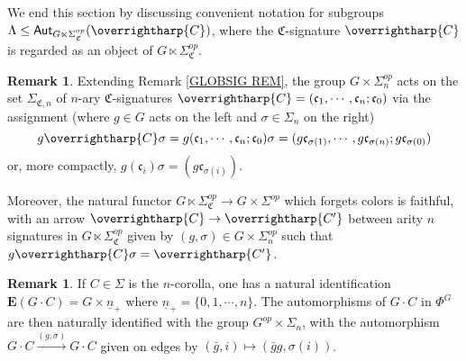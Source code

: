 \documentclass[a4paper,10pt
,draft
]{article}%
\numberwithin{equation}{section}
\numberwithin{figure}{section}
\theoremstyle{definition} %
\newtheorem{remark}[equation]{Remark}%
\newcommand{\vect}[1]{\text{\overrightharp{\ensuremath{#1}}}}
\newcommand{\1}{\ensuremath{\mathbbm 1}}%
\begin{document}
We end this section by discussing convenient notation  
for subgroups 
$\Lambda \leq \mathsf{Aut}_{G \ltimes \Sigma_{\mathfrak{C}}^{op}}(\vect{C})$,
where the $\mathfrak{C}$-signature $\vect{C}$
is regarded as an object of 
$G \ltimes \Sigma_{\mathfrak{C}}^{op}$.



\begin{remark}\label{SIGACT REM}
Extending Remark \ref{GLOBSIG REM}, 
the group $G \times \Sigma_n^{op}$
acts on the set $\Sigma_{\mathfrak{C},n}$
of $n$-ary $\mathfrak{C}$-signatures
$\vect{C} = (\mathfrak{c}_1,\cdots,\mathfrak{c}_n;\mathfrak{c}_0)$
via the assignment (where $g \in G$ acts on the left and $\sigma \in \Sigma_n$ on the right)
\begin{equation}\label{SIGACT_EQ}
	g \vect{C} \sigma =
	g (\mathfrak{c}_1,\cdots,\mathfrak{c}_n;\mathfrak{c}_0) \sigma
=
	(g\mathfrak{c}_{\sigma(1)},\cdots,g\mathfrak{c}_{\sigma(n)};g\mathfrak{c}_{\sigma(0)})
\end{equation}
or, more compactly, $g (\mathfrak{c}_i) \sigma = (g \mathfrak{c}_{\sigma(i)})$.

Moreover, the natural functor 
$G \ltimes \Sigma^{op}_{\mathfrak{C}}
\to G \times \Sigma^{op}$
which forgets colors is faithful,
with an arrow
$\vect{C} \to \vect{C'}$
between arity $n$ signatures
in $G \ltimes \Sigma_{\mathfrak{C}}^{op}$
given by 
$(g,\sigma) \in G \times \Sigma_n^{op}$
such that
$g \vect{C} \sigma = \vect{C'}$.
\end{remark}



\begin{remark}\label{GCDOTCATS REM}
If  $C \in \Sigma$ is the $n$-corolla,
one has a natural identification
$\boldsymbol{E}(G\cdot C) = G \times \underline{n}_+$
where
$\underline{n}_+ = \{0,1,\cdots,n\}$.
The automorphisms of
$G \cdot C$ in $\Phi^G$
are then naturally identified with the group
$G^{op} \times \Sigma_n$,
with the automorphism
$G \cdot C \xrightarrow{(g,\sigma)} G \cdot C$
given on edges by
$(\bar{g},i) \mapsto (\bar{g}g,\sigma(i))$.
\end{remark}

 
\end{document}
